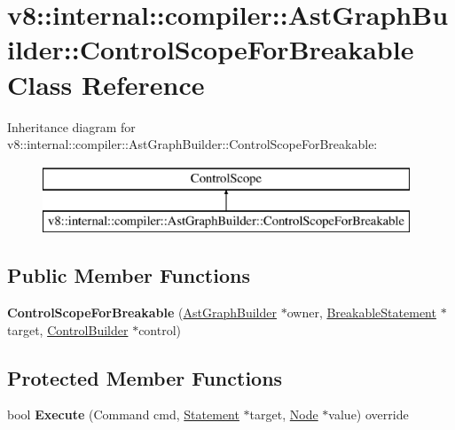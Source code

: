 \hypertarget{classv8_1_1internal_1_1compiler_1_1_ast_graph_builder_1_1_control_scope_for_breakable}{}\section{v8\+:\+:internal\+:\+:compiler\+:\+:Ast\+Graph\+Builder\+:\+:Control\+Scope\+For\+Breakable Class Reference}
\label{classv8_1_1internal_1_1compiler_1_1_ast_graph_builder_1_1_control_scope_for_breakable}
Inheritance diagram for v8\+:\+:internal\+:\+:compiler\+:\+:Ast\+Graph\+Builder\+:\+:Control\+Scope\+For\+Breakable\+:\begin{figure}[H]
\begin{center}
\leavevmode
\includegraphics[height=2.000000cm]{classv8_1_1internal_1_1compiler_1_1_ast_graph_builder_1_1_control_scope_for_breakable}
\end{center}
\end{figure}
\subsection*{Public Member Functions}
\begin{DoxyCompactItemize}
\item 
{\bfseries Control\+Scope\+For\+Breakable} (\hyperlink{classv8_1_1internal_1_1compiler_1_1_ast_graph_builder}{Ast\+Graph\+Builder} $\ast$owner, \hyperlink{classv8_1_1internal_1_1_breakable_statement}{Breakable\+Statement} $\ast$target, \hyperlink{classv8_1_1internal_1_1compiler_1_1_control_builder}{Control\+Builder} $\ast$control)\hypertarget{classv8_1_1internal_1_1compiler_1_1_ast_graph_builder_1_1_control_scope_for_breakable_a6726f4a7184a21504c33c857e47c26a8}{}\label{classv8_1_1internal_1_1compiler_1_1_ast_graph_builder_1_1_control_scope_for_breakable_a6726f4a7184a21504c33c857e47c26a8}

\end{DoxyCompactItemize}
\subsection*{Protected Member Functions}
\begin{DoxyCompactItemize}
\item 
bool {\bfseries Execute} (Command cmd, \hyperlink{classv8_1_1internal_1_1_statement}{Statement} $\ast$target, \hyperlink{classv8_1_1internal_1_1compiler_1_1_node}{Node} $\ast$value) override\hypertarget{classv8_1_1internal_1_1compiler_1_1_ast_graph_builder_1_1_control_scope_for_breakable_a6ea0fb033140cbbfc06aa965b00f0eb4}{}\label{classv8_1_1internal_1_1compiler_1_1_ast_graph_builder_1_1_control_scope_for_breakable_a6ea0fb033140cbbfc06aa965b00f0eb4}

\end{DoxyCompactItemize}
